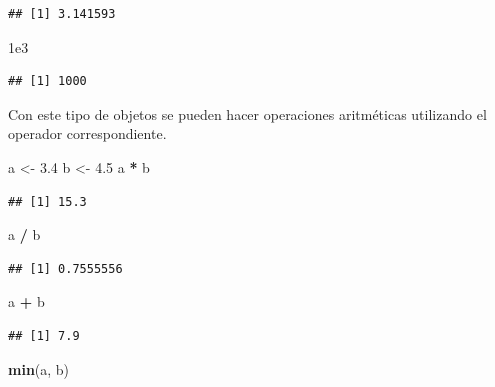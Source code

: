 \documentclass[]{book}
\newenvironment{Shaded}{\begin{snugshade}}{\end{snugshade}}
\newcommand{\FloatTok}[1]{\textcolor[rgb]{0.00,0.00,0.81}{#1}}
\newcommand{\KeywordTok}[1]{\textcolor[rgb]{0.13,0.29,0.53}{\textbf{#1}}}
\newcommand{\NormalTok}[1]{#1}
\newcommand{\OperatorTok}[1]{\textcolor[rgb]{0.81,0.36,0.00}{\textbf{#1}}}
\newcommand{\StringTok}[1]{\textcolor[rgb]{0.31,0.60,0.02}{#1}}
\begin{document}
\begin{verbatim}
## [1] 3.141593
\end{verbatim}

\begin{Shaded}
\begin{Highlighting}[]
\FloatTok{1e3}
\end{Highlighting}
\end{Shaded}

\begin{verbatim}
## [1] 1000
\end{verbatim}

Con este tipo de objetos se pueden hacer operaciones aritméticas
utilizando el operador correspondiente.

\begin{Shaded}
\begin{Highlighting}[]
\NormalTok{a <-}\StringTok{ }\FloatTok{3.4}
\NormalTok{b <-}\StringTok{ }\FloatTok{4.5}
\NormalTok{a }\OperatorTok{*}\StringTok{ }\NormalTok{b}
\end{Highlighting}
\end{Shaded}

\begin{verbatim}
## [1] 15.3
\end{verbatim}

\begin{Shaded}
\begin{Highlighting}[]
\NormalTok{a }\OperatorTok{/}\StringTok{ }\NormalTok{b}
\end{Highlighting}
\end{Shaded}

\begin{verbatim}
## [1] 0.7555556
\end{verbatim}

\begin{Shaded}
\begin{Highlighting}[]
\NormalTok{a }\OperatorTok{+}\StringTok{ }\NormalTok{b}
\end{Highlighting}
\end{Shaded}

\begin{verbatim}
## [1] 7.9
\end{verbatim}

\begin{Shaded}
\begin{Highlighting}[]
\KeywordTok{min}\NormalTok{(a, b)}
\end{Highlighting}
\end{Shaded}
\end{document}
